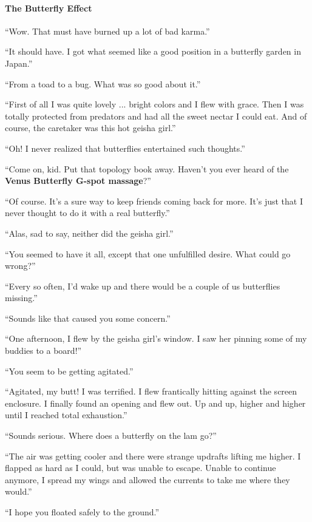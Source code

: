 \paragraph{The Butterfly Effect}

``Wow. That must have burned up a lot of bad karma.''

``It should have. I got what seemed like a good position in a butterfly garden in Japan.''

``From a toad to a bug. What was so good about it.''

``First of all I was quite lovely ... bright colors and I flew with grace. Then I was totally protected from predators and had all the sweet nectar I could eat. And of course, the caretaker was this hot geisha girl.''

``Oh! I never realized that butterflies entertained such thoughts.''

``Come on, kid. Put that topology book away. Haven't you ever heard of the \textbf{Venus Butterfly G-spot massage}?''

``Of course. It's a sure way to keep friends coming back for more. It's just that I never thought to do it with a real butterfly.''

``Alas, sad to say, neither did the geisha girl.''

``You seemed to have it all, except that one unfulfilled desire. What could go wrong?''

``Every so often, I'd wake up and there would be a couple of us butterflies missing.''

``Sounds like that caused you some concern.''

``One afternoon, I flew by the geisha girl's window. I saw her pinning some of my buddies to a board!''

``You seem to be getting agitated.''

``Agitated, my butt! I was terrified. I flew frantically hitting against the screen enclosure. I finally found an opening and flew out. Up and up, higher and higher until I reached total exhaustion.''

``Sounds serious. Where does a butterfly on the lam go?''

``The air was getting cooler and there were strange updrafts lifting me higher. I flapped as hard as I could, but was unable to escape. Unable to continue anymore, I spread my wings and allowed the currents to take me where they would.''

``I hope you floated safely to the ground.''

